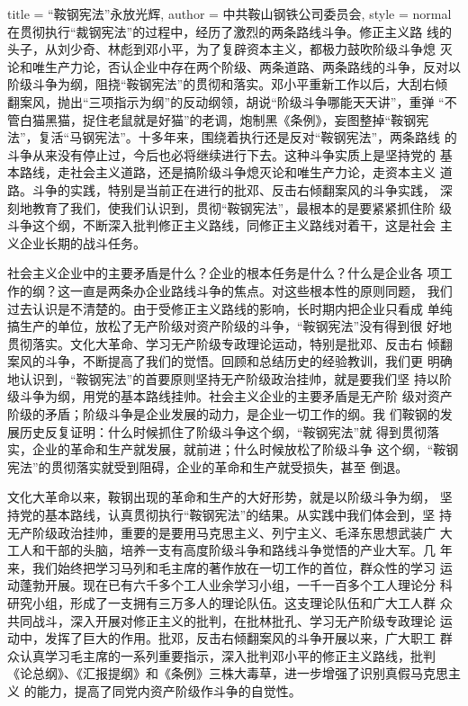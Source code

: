 \begin{hongqiarticle}{
        title  = {“鞍钢宪法”永放光辉},
        author = {中共鞍山钢铁公司委员会},
        style  = normal
    }
    在贯彻执行“裁钢宪法”的过程中，经历了激烈的两条路线斗争。修正主义路
    线的头子，从刘少奇、林彪到邓小平，为了复辟资本主义，都极力鼓吹阶级斗争熄
    灭论和唯生产力论，否认企业中存在两个阶级、两条道路、两条路线的斗争，反对以
    阶级斗争为纲，阻挠“鞍钢宪法”的贯彻和落实。邓小平重新工作以后，大刮右倾
    翻案风，抛出“三项指示为纲”的反动纲领，胡说“阶级斗争哪能天天讲”，重弹
    “不管白猫黑猫，捉住老鼠就是好猫”的老调，炮制黑《条例》，妄图整掉“鞍钢宪
    法”，复活“马钢宪法”。十多年来，围绕着执行还是反对“鞍钢宪法”，两条路线
    的斗争从来没有停止过，今后也必将继续进行下去。这种斗争实质上是坚持党的
    基本路线，走社会主义道路，还是搞阶级斗争熄灭论和唯生产力论，走资本主义
    道路。斗争的实践，特别是当前正在进行的批邓、反击右倾翻案风的斗争实践，
    深刻地教育了我们，使我们认识到，贯彻“鞍钢宪法”，最根本的是要紧紧抓住阶
    级斗争这个纲，不断深入批判修正主义路线，同修正主义路线对着干，这是社会
    主义企业长期的战斗任务。

    社会主义企业中的主要矛盾是什么？企业的根本任务是什么？什么是企业各
    项工作的纲？这一直是两条办企业路线斗争的焦点。对这些根本性的原则同题，
    我们过去认识是不清楚的。由于受修正主义路线的影响，长时期内把企业只看成
    单纯搞生产的单位，放松了无产阶级对资产阶级的斗争，“鞍钢宪法”没有得到很
    好地贯彻落实。文化大革命、学习无产阶级专政理论运动，特别是批邓、反击右
    倾翻案风的斗争，不断提高了我们的觉悟。回顾和总结历史的经验教训，我们更
    明确地认识到，“鞍钢宪法”的首要原则坚持无产阶级政治挂帅，就是要我们坚
    持以阶级斗争为纲，用党的基本路线挂帅。社会主义企业的主要矛盾是无产阶
    级对资产阶级的矛盾；阶级斗争是企业发展的动力，是企业一切工作的纲。我
    们鞍钢的发展历史反复证明：什么时候抓住了阶级斗争这个纲，“鞍钢宪法”就
    得到贯彻落实，企业的革命和生产就发展，就前进；什么时候放松了阶级斗争
    这个纲，“鞍钢宪法”的贯彻落实就受到阻碍，企业的革命和生产就受损失，甚至
    倒退。

    文化大革命以来，鞍钢出现的革命和生产的大好形势，就是以阶级斗争为纲，
    坚持党的基本路线，认真贯彻执行“鞍钢宪法”的结果。从实践中我们体会到，坚
    持无产阶级政治挂帅，重要的是要用马克思主义、列宁主义、毛泽东思想武装广
    大工人和干部的头脑，培养一支有高度阶级斗争和路线斗争觉悟的产业大军。几
    年来，我们始终把学习马列和毛主席的著作放在一切工作的首位，群众性的学习
    运动蓬勃开展。现在已有六千多个工人业余学习小组，一千一百多个工人理论分
    科研究小组，形成了一支拥有三万多人的理论队伍。这支理论队伍和广大工人群
    众共同战斗，深入开展对修正主义的批判，在批林批孔、学习无产阶级专政理论
    运动中，发挥了巨大的作用。批邓，反击右倾翻案风的斗争开展以来，广大职工
    群众认真学习毛主席的一系列重要指示，深入批判邓小平的修正主义路线，批判
    《论总纲》、《汇报提纲》和《条例》三株大毒草，进一步增强了识别真假马克思主义
    的能力，提高了同党内资产阶级作斗争的自觉性。


\end{hongqiarticle}
